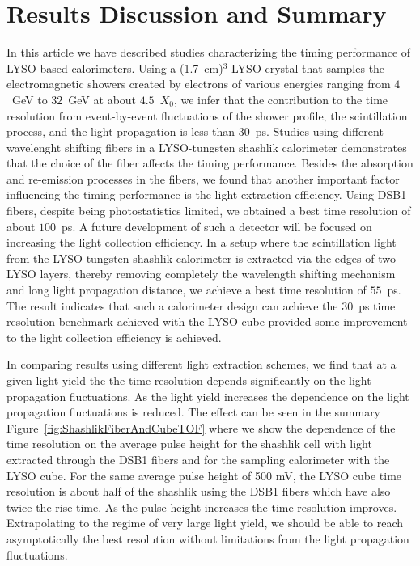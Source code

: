 \documentclass[12pt]{article}
\begin{document}
\section{Results Discussion and Summary }

In this article we have described studies characterizing the timing performance
of LYSO-based calorimeters. Using a (1.7~cm)$^{3}$ LYSO crystal that
samples the electromagnetic showers created by electrons of various energies
ranging from $4$~GeV to $32$~GeV at about $4.5$~$X_{0}$, we infer that the
contribution to the time resolution from event-by-event fluctuations of the
shower profile, the scintillation process, and the light propagation is less than
$30$~ps. Studies using different  wavelenght shifting fibers in a LYSO-tungsten shashlik calorimeter 
demonstrates that the choice of the fiber affects the timing performance. Besides the absorption and re-emission
processes in the fibers, we found that another important factor influencing
the timing performance is the light extraction efficiency. Using DSB1 fibers, despite being photostatistics limited, we
obtained a best time resolution of about $100$~ps.  A future development of
such a detector will  be focused on increasing the light collection efficiency.
In a setup where  the scintillation light from the LYSO-tungsten
shashlik calorimeter is extracted via the edges of two LYSO layers, thereby
removing completely the wavelength shifting mechanism and long light propagation distance, we achieve a best
time resolution of $55$~ps. The result  indicates  that such a
calorimeter design can achieve the $30$~ps time resolution benchmark achieved with the LYSO cube
provided some improvement to the light collection efficiency is achieved.

In comparing results using different light extraction schemes, we find that at a given light yield the 
the time resolution depends significantly on the light propagation fluctuations. As the light yield increases 
the dependence on the  light propagation fluctuations is reduced.  The effect can be seen in the summary Figure~\ref{fig:ShashlikFiberAndCubeTOF} where we show the dependence
of the time resolution on the average pulse height for the shashlik cell with light extracted through the
DSB1 fibers and for the sampling calorimeter with the  LYSO cube. 
For the same average pulse height of 500 mV,  the LYSO cube time resolution is about half of the shashlik using
the DSB1 fibers which have also twice the rise time. As the pulse height increases the time resolution improves. 
Extrapolating to the regime of very large light yield, we should be able to reach asymptotically the best resolution 
without limitations from the light propagation fluctuations. 
\end{document}
